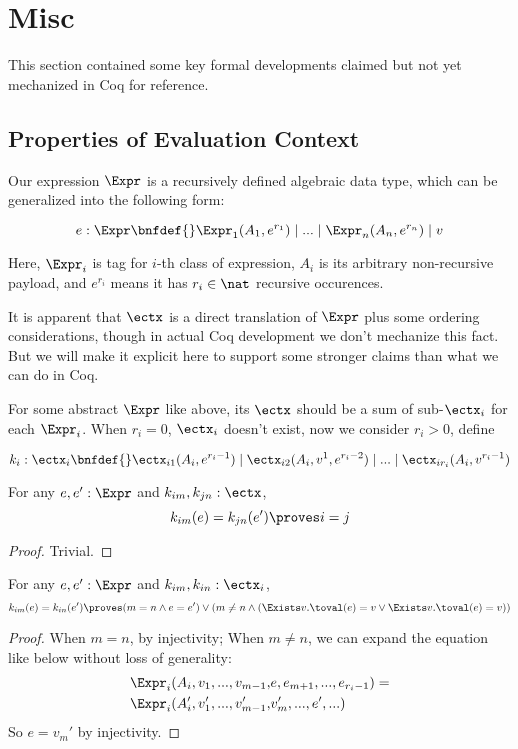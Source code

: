\section{Misc}
\label{sec:misc}

This section contained some key formal developments claimed but not yet mechanized in Coq for reference.

\subsection{Properties of Evaluation Context}

Our expression $\Expr$ is a recursively defined algebraic data type, which can be generalized into the following form:

\[
e : \Expr \bnfdef{} \Expr_1(A_1, e^{r_1}) \mid ... \mid \Expr_n(A_n, e^{r_n}) \mid v
\]

Here, $\Expr_i$ is tag for $i$-th class of expression, $A_i$ is its arbitrary non-recursive payload, and $e^{r_i}$ means
it has $r_i \in \nat$ recursive occurences.

It is apparent that $\ectx$ is a direct translation of $\Expr$ plus some ordering considerations, though in actual Coq development we don't mechanize this fact.
But we will make it explicit here to support some stronger claims than what we can do in Coq.

For some abstract $\Expr$ like above, its $\ectx$ should be a sum of sub-$\ectx_i$ for each $\Expr_i$. When $r_i = 0$, $\ectx_i$ doesn't exist, now we consider
$r_i > 0$, define

\[
k_i: \ectx_i \bnfdef{} \ectx_{i1}(A_i, e^{r_i - 1}) \mid \ectx_{i2}(A_i, v^1, e^{r_i - 2}) \mid ... \mid \ectx_{ir_i}(A_i, v^{r_i - 1})
\]

\begin{theorem}
For any $e, e': \Expr$ and $k_{im}, k_{jn}: \ectx$,
\[k_{im}(e) = k_{jn}(e') \proves i = j \]
\end{theorem}
\begin{proof} Trivial. \end{proof}

\begin{theorem}
For any $e, e': \Expr$ and $k_{im}, k_{in}: \ectx_i$,
\[k_{im}(e) = k_{in}(e') \proves
 (m = n \land e = e') \lor
 (m \neq n \land (\Exists v. \toval(e) = v \lor \Exists v. \toval(e) = v))\]
\end{theorem}
\begin{proof} 

When $m = n$, by injectivity;
When $m \neq n$, we can expand the equation like below without loss of generality:
\begin{align*}
\Expr_i(A_i, v_1, ..., v_{m - 1}, &e, e_{m + 1}, ..., e_{r_i - 1}) = \\
\Expr_i(A_i', v_1', ..., v_{m - 1}', &v_m', ..., e', ...)
\end{align*}
So $e = v_m'$ by injectivity.
\end{proof}

